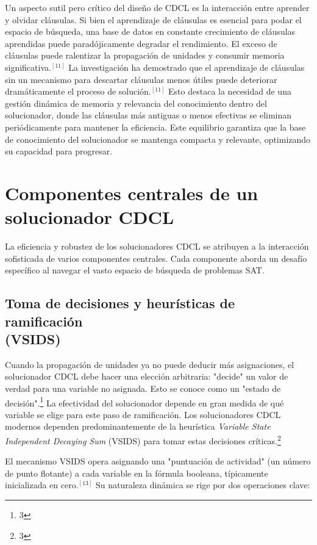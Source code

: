 \documentclass{article}
\begin{document}
Un aspecto sutil pero crítico del diseño de CDCL es la interacción entre aprender y olvidar cláusulas. Si bien el aprendizaje de cláusulas es esencial para podar el espacio de búsqueda, una base de datos en constante crecimiento de cláusulas aprendidas puede paradójicamente degradar el rendimiento. El exceso de cláusulas puede ralentizar la propagación de unidades y consumir memoria significativa.$^{[11]}$ La investigación ha demostrado que el aprendizaje de cláusulas sin un mecanismo para descartar cláusulas menos útiles puede deteriorar dramáticamente el proceso de solución.$^{[11]}$ Esto destaca la necesidad de una gestión dinámica de memoria y relevancia del conocimiento dentro del solucionador, donde las cláusulas más antiguas o menos efectivas se eliminan periódicamente para mantener la eficiencia. Este equilibrio garantiza que la base de conocimiento del solucionador se mantenga compacta y relevante, optimizando su capacidad para progresar.

\section{Componentes centrales de un solucionador CDCL}

La eficiencia y robustez de los solucionadores CDCL se atribuyen a la interacción sofisticada de varios componentes centrales. Cada componente aborda un desafío específico al navegar el vasto espacio de búsqueda de problemas SAT.

\subsection{Toma de decisiones y heurísticas de ramificación\\(VSIDS)}

Cuando la propagación de unidades ya no puede deducir más asignaciones, el solucionador CDCL debe hacer una elección arbitraria: "decide" un valor de verdad para una variable no asignada. Esto se conoce como un "estado de decisión".\footnote{3} La efectividad del solucionador depende en gran medida de qué variable se elige para este paso de ramificación. Los solucionadores CDCL modernos dependen predominantemente de la heurística \textit{Variable State Independent Decaying Sum} (VSIDS) para tomar estas decisiones críticas.\footnote{3}

El mecanismo VSIDS opera asignando una "puntuación de actividad" (un número de punto flotante) a cada variable en la fórmula booleana, típicamente inicializada en cero.$^{[13]}$ Su naturaleza dinámica se rige por dos operaciones clave:
\end{document}
